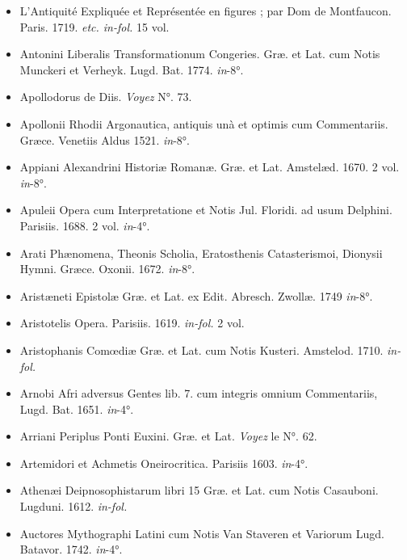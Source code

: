 \documentclass[a4paper, 11pt, oneside, polutonikogreek, french]{article}
\begin{document}
\begin{itemize}
    \item L'Antiquité Expliquée et Représentée en figures ; par Dom de Montfaucon. Paris. 1719. \emph{etc. in-fol.} 15 vol.

    \item Antonini Liberalis Transformationum Congeries. Græ. et Lat. cum Notis Munckeri et Verheyk. Lugd. Bat. 1774. \emph{in}-8°.

    \item Apollodorus de Diis. \emph{Voyez} N°. 73.

    \item Apollonii Rhodii Argonautica, antiquis unà et optimis cum Commentariis. Græce. Venetiis Aldus 1521. \emph{in}-8°.

    \item Appiani Alexandrini Historiæ Romanæ. Græ. et Lat. Amstelæd. 1670. 2 vol. \emph{in}-8°.

    \item Apuleii Opera cum Interpretatione et Notis Jul. Floridi. ad usum Delphini. Parisiis. 1688. 2 vol. \emph{in}-4°.

    \item Arati Phænomena, Theonis Scholia, Eratosthenis Catasterismoi, Dionysii Hymni. Græce. Oxonii. 1672. \emph{in}-8°.

    \item Aristæneti Epistolæ Græ. et Lat. ex Edit. Abresch. Zwollæ. 1749 \emph{in}-8°.

    \item Aristotelis Opera. Parisiis. 1619. \emph{in-fol.} 2 vol.

    \item Aristophanis Comœdiæ Græ. et Lat. cum Notis Kusteri. Amstelod. 1710. \emph{in-fol.}

    \item Arnobi Afri adversus Gentes lib. 7. cum integris omnium Commentariis, Lugd. Bat. 1651. \emph{in}-4°.

    \item Arriani Periplus Ponti Euxini. Græ. et Lat. \emph{Voyez} le N°. 62.

    \item Artemidori et Achmetis Oneirocritica. Parisiis 1603. \emph{in}-4°.

    \item Athenæi Deipnosophistarum libri 15 Græ. et Lat. cum Notis Casauboni. Lugduni. 1612. \emph{in-fol.}

    \item Auctores Mythographi Latini cum Notis Van Staveren et Variorum Lugd. Batavor. 1742. \emph{in}-4°.


\end{itemize}
\end{document}
